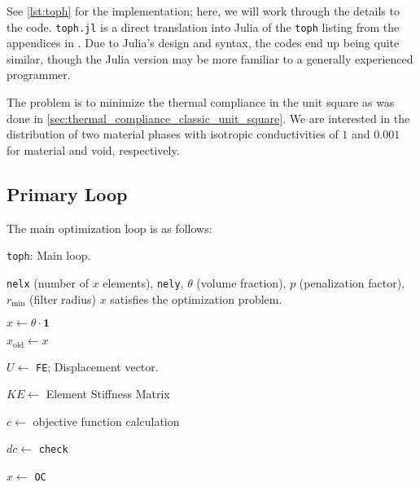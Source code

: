 See \autoref{lst:toph} for the implementation; here, we will work through the details to the code. \texttt{toph.jl}
is a direct translation
into Julia of the \texttt{toph} listing from the appendices in \cite{bendsoe_sigmund_topopt}. Due to Julia's
design and syntax, the codes end up being quite similar, though the Julia version may be more
familiar to a generally experienced programmer.

The problem is to minimize the thermal compliance in the unit square as was done in \autoref{sec:thermal_compliance_classic_unit_square}.
We are interested in the distribution of two material phases with isotropic conductivities of $1$ and $0.001$ for material and void, respectively.




\subsection{Primary Loop}
The main optimization loop is as follows:
\begin{algorithm}
    \caption{\texttt{toph}: Main loop.}\label{alg:toph_main}
    \begin{algorithmic}
    \Require \texttt{nelx} (number of $x$ elements), \texttt{nely}, $\theta$ (volume fraction), $p$ (penalization factor), $r_{\text{min}}$ (filter radius)
    \Ensure $x$ satisfies the optimization problem.

    \State $x \gets \theta \cdot \mathbf{1}$ 


        $x_\text{old} \gets x$

        $U \gets$ \texttt{FE}; Displacement vector. 

        $KE \gets$ Element Stiffness Matrix

        $c \gets$ objective function calculation

        $dc \gets$ \texttt{check} 

        $x \gets$ \texttt{OC} 

    \EndWhile
    \end{algorithmic}
\end{algorithm}

